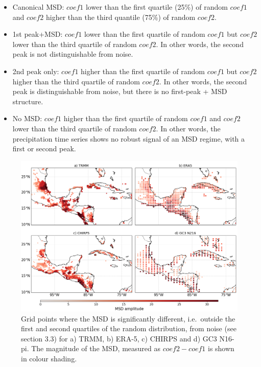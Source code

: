 \begin{itemize}
\item Canonical MSD: $coef1$ lower than the first quartile (25\%) of random $coef1$ and $coef2$ higher than the third quantile (75\%) of random $coef2$.
\item 1st peak+MSD: $coef1$ lower than the first quartile of random $coef1$ but $coef2$ lower than the third quartile of random $coef2$. In other words, the second peak is not distinguishable from noise.
\item 2nd peak only: $coef1$ higher than the first quartile of random $coef1$ but $coef2$ higher than the third quartile of random $coef2$. In other words, the second peak is distinguishable from noise, but there is no first-peak + MSD structure.
\item No MSD: $coef1$ higher than the first quartile of random $coef1$ and $coef2$ lower than the third quartile of random $coef2$. In other words, the precipitation time series shows no robust signal of an MSD regime, with a first or second peak.
\end{itemize}
 
\begin{figure}[t!]
\centering
\includegraphics[width=\linewidth]{figures/wav_fig12.png}
\caption[Map of MSD significant regions]{Grid points where the MSD is significantly different, i.e.\, outside the first and second quartiles of the random distribution, from noise (see section 3.3) for a) TRMM, b) ERA-5, c) CHIRPS and d) GC3 N16-pi.  The magnitude of the MSD, measured as $coef2-coef1$ is shown in colour shading.  }
\label{fig:wavfinalmap}
\end{figure} 
 
